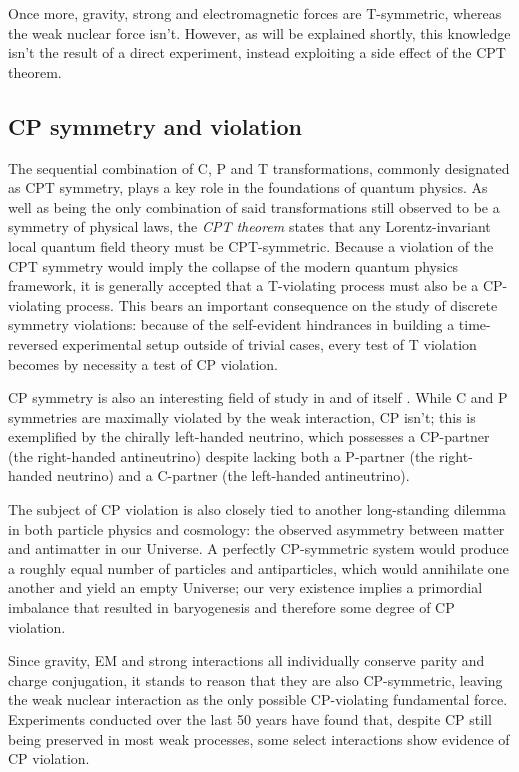 Once more, gravity, strong and electromagnetic forces are T-symmetric, whereas the weak nuclear force isn't.
However, as will be explained shortly, this knowledge isn't the result of a direct experiment, instead exploiting a side effect of the CPT theorem.

\subsection{CP symmetry and violation}
\label{sec:CP-symmetry-violation}
The sequential combination of C, P and T transformations, commonly designated as CPT symmetry, plays a key role in the foundations of quantum physics.
As well as being the only combination of said transformations still observed to be a symmetry of physical laws, the \textit{CPT theorem} states that any Lorentz-invariant local quantum field theory must be CPT-symmetric.
Because a violation of the CPT symmetry would imply the collapse of the modern quantum physics framework, it is generally accepted that a T-violating process must also be a CP-violating process.
This bears an important consequence on the study of discrete symmetry violations: because of the self-evident hindrances in building a time-reversed experimental setup outside of trivial cases, every test of T violation becomes by necessity a test of CP violation.

CP symmetry is also an interesting field of study in and of itself \cite{cpvws}.
While C and P symmetries are maximally violated by the weak interaction, CP isn't;
this is exemplified by the chirally left-handed neutrino, which possesses a CP-partner (the right-handed antineutrino) despite lacking both a P-partner (the right-handed neutrino) and a C-partner (the left-handed antineutrino).

The subject of CP violation is also closely tied to another long-standing dilemma in both particle physics and cosmology: the observed asymmetry between matter and antimatter in our Universe.
A perfectly CP-symmetric system would produce a roughly equal number of particles and antiparticles, which would annihilate one another and yield an empty Universe;
our very existence implies a primordial imbalance that resulted in baryogenesis and therefore some degree of CP violation.

Since gravity, EM and strong interactions all individually conserve parity and charge conjugation, it stands to reason that they are also CP-symmetric, leaving the weak nuclear interaction as the only possible CP-violating fundamental force.
Experiments conducted over the last 50 years have found that, despite CP still being preserved in most weak processes, some select interactions show evidence of CP violation.

